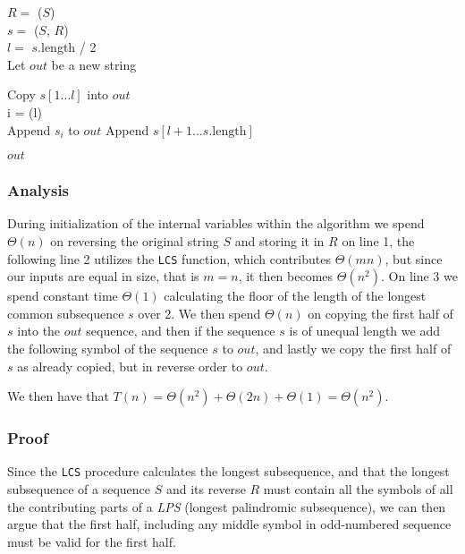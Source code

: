 \documentclass[11pt,english]{article}
\begin{document}
\begin{algorithm}
	
	\BlankLine
	
	$R =$ \Reverse($S$)\\
	$s =$ \LCS($S$, $R$)\\
	$l =$ $s$.length / 2\\
	Let $out$ be a new string
	
	Copy $s[1 \dots l]$ into $out$\\
	{
		i = \Ceil(l)\\
		Append $s_i$ to $out$
	}
	Append $s[l+1 \dots s\text{.length}]$
	
	\Return $out$	
\end{algorithm}

\subsubsection*{Analysis}
During initialization of the internal variables within the algorithm we spend
$\Theta(n)$ on reversing the original string $S$ and storing it in $R$ on line
1, the following line 2 utilizes the \texttt{LCS} function, which contributes
$\Theta(mn)$, but since our inputs are equal in size, that is $m = n$, it then
becomes $\Theta(n^2)$. On line 3 we spend constant time $\Theta(1)$
calculating the floor of the length of the longest common subsequence $s$ over
2. We then spend $\Theta(n)$ on copying the first half of $s$ into the $out$
sequence, and then if the sequence $s$ is of unequal length we add the
following symbol of the sequence $s$ to $out$, and lastly we copy the first
half of $s$ as already copied, but in reverse order to $out$.

We then have that $T(n) = \Theta(n^2) + \Theta(2n) + \Theta(1) = \Theta(n^2)$.

\subsubsection*{Proof}
Since the \texttt{LCS} procedure calculates the longest subsequence, and that
the longest subsequence of a sequence $S$ and its reverse $R$ must contain all
the symbols of all the contributing parts of a \textit{LPS} (longest
palindromic subsequence), we can then argue that the first half, including any
middle symbol in odd-numbered sequence must be valid for the first half.
\end{document}
